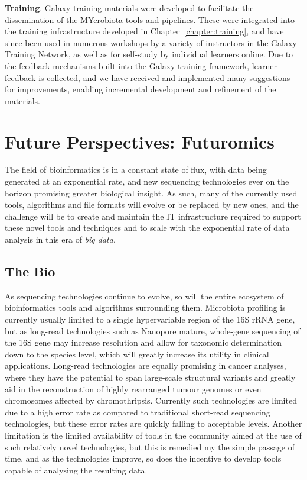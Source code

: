 \textbf{Training}. Galaxy training materials were developed to facilitate the dissemination of the MYcrobiota tools and pipelines. These were integrated into the training infrastructure developed in Chapter~\ref{chapter:training}, and have since been used in numerous workshops by a variety of instructors in the Galaxy Training Network, as well as for self-study by individual learners online. Due to the feedback mechanisms built into the Galaxy training framework, learner feedback is collected, and we have received and implemented many suggestions for improvements, enabling incremental development and refinement of the materials.

\section{Future Perspectives: Futuromics}

The field of bioinformatics is in a constant state of flux, with data being generated at an exponential rate, and new sequencing technologies ever on the horizon promising greater biological insight. As such, many of the currently used tools, algorithms and file formats will evolve or be replaced by new ones, and the challenge will be to create and maintain the IT infrastructure required to support these novel tools and techniques and to scale with the exponential rate of data analysis in this era of \emph{big data}.

\subsection{The Bio}
As sequencing technologies continue to evolve, so will the entire ecosystem of bioinformatics tools and algorithms surrounding them. Microbiota profiling is currently usually limited to a single hypervariable region of the 16S rRNA gene, but as long-read technologies such as Nanopore mature, whole-gene sequencing of the 16S gene may increase resolution and allow for taxonomic determination down to the species level, which will greatly increase its utility in clinical applications. Long-read technologies are equally promising in cancer analyses, where they have the potential to span large-scale structural variants and greatly aid in the reconstruction of highly rearranged tumour genomes or even chromosomes affected by chromothripsis. Currently such technologies are limited due to a high error rate as compared to traditional short-read sequencing technologies, but these error rates are quickly falling to acceptable levels. Another limitation is the limited availability of tools in the community aimed at the use of such relatively novel technologies, but this is remedied my the simple passage of time, and as the technologies improve, so does the incentive to develop tools capable of analysing the resulting data.

